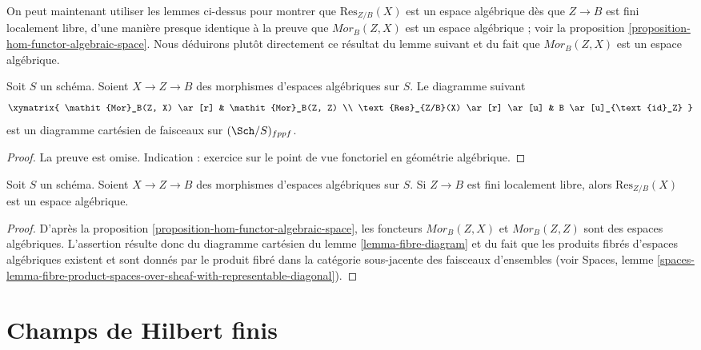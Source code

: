 \noindent
On peut maintenant utiliser les lemmes ci-dessus pour montrer que $\text{Res}_{Z/B}(X)$
est un espace algébrique dès que $Z \to B$ est fini localement libre, d'une manière
presque identique à la preuve que $\mathit{Mor}_B(Z, X)$ est un
espace algébrique ; voir la
proposition \ref{proposition-hom-functor-algebraic-space}.
Nous déduirons plutôt directement ce résultat du lemme suivant
et du fait que $\mathit{Mor}_B(Z, X)$ est un espace algébrique.

\begin{lemma}
\label{lemma-fibre-diagram}
Soit $S$ un schéma. Soient $X \to Z \to B$ des morphismes
d'espaces algébriques sur $S$. Le diagramme suivant
$$
\xymatrix{
\mathit{Mor}_B(Z, X) \ar[r] & \mathit{Mor}_B(Z, Z) \\
\text{Res}_{Z/B}(X) \ar[r] \ar[u] & B \ar[u]_{\text{id}_Z}
}
$$
est un diagramme cartésien de faisceaux sur $(\Sch/S)_{fppf}$.
\end{lemma}

\begin{proof}
La preuve est omise. Indication : exercice sur le point de vue fonctoriel en
géométrie algébrique.
\end{proof}

\begin{proposition}
\label{proposition-restriction-of-scalars-algebraic-space}
Soit $S$ un schéma. Soient $X \to Z \to B$ des morphismes
d'espaces algébriques sur $S$. Si $Z \to B$ est fini localement libre,
alors $\text{Res}_{Z/B}(X)$ est un espace algébrique.
\end{proposition}

\begin{proof}
D'après la
proposition \ref{proposition-hom-functor-algebraic-space},
les foncteurs $\mathit{Mor}_B(Z, X)$ et $\mathit{Mor}_B(Z, Z)$
sont des espaces algébriques. L'assertion résulte donc du diagramme cartésien
du
lemme \ref{lemma-fibre-diagram}
et du fait que les produits fibrés d'espaces algébriques existent et
sont donnés par le produit fibré dans la catégorie sous-jacente des
faisceaux d'ensembles (voir
Spaces, lemme
\ref{spaces-lemma-fibre-product-spaces-over-sheaf-with-representable-diagonal}).
\end{proof}






\section{Champs de Hilbert finis}
\label{section-finite-hilbert-stacks}

